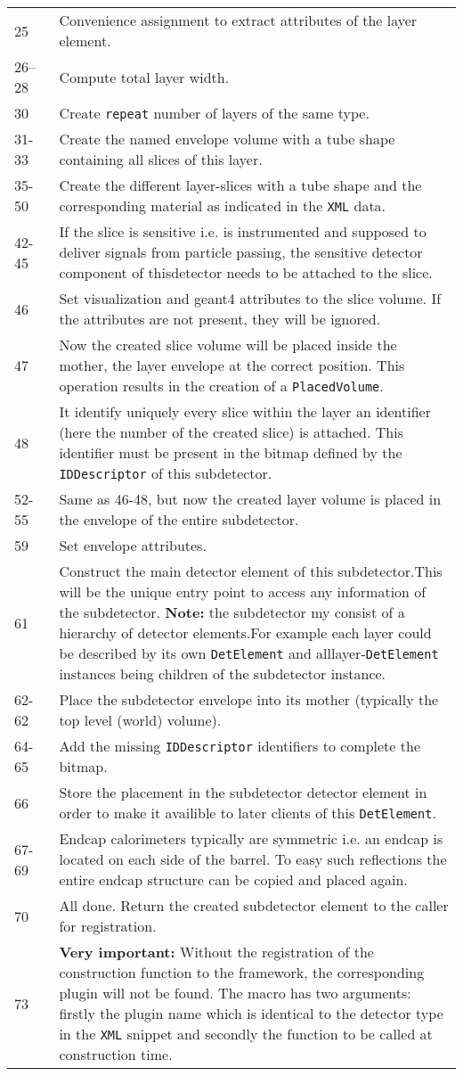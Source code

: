 {\begin{tabular} {p{0.1\linewidth}|p{0.9\linewidth}}
25 & Convenience assignment to extract attributes of the layer element.\\
26--28 & Compute total layer width.\\
30 & Create \texttt{repeat} number of layers of the same type.\\
31-33 & Create the named envelope volume with a tube shape containing all slices of this layer.\\
35-50 & Create the different layer-slices with a tube shape and the corresponding material as indicated in the \texttt{XML} data.\\
42-45 & If the slice is sensitive i.e. is instrumented and supposed to deliver signals from particle passing, the sensitive detector component of thisdetector needs to be attached to the slice.\\
46 & Set visualization and geant4 attributes to the slice volume. If the attributes are not present, they will be ignored.\\
47 & Now the created slice volume will be placed inside the mother, the layer envelope at the correct position. This operation results in the creation of a \texttt{PlacedVolume}.\\
48 & It identify uniquely every slice within the layer an identifier (here the number of the created slice) is attached. This identifier must be present in the bitmap defined by the \texttt{IDDescriptor} of this subdetector.\\
52-55 & Same as 46-48, but now the created layer volume is placed in the envelope of the entire subdetector.\\
59 & Set envelope attributes.\\
61 & Construct the main detector element of this subdetector.This will be the unique entry point to access any information of the subdetector. {\textbf{Note:}} the subdetector my consist of a hierarchy of detector elements.For example each layer could be described by its own \texttt{DetElement} and alllayer-\texttt{DetElement} instances being children of the subdetector instance.\\
62-62 & Place the subdetector envelope into its mother (typically the top level (world) volume).\\
64-65 & Add the missing \texttt{IDDescriptor} identifiers to complete the bitmap.\\
66 & Store the placement in the subdetector detector element in order to make it availible to later clients of this \texttt{DetElement}. \\
67-69 & Endcap calorimeters typically are symmetric i.e. an endcap is located on each side of the barrel. To easy such reflections the entire endcap structure can be copied and placed again. \\
70 & All done. Return the created subdetector element to the caller for registration. \\ 
73 & \textbf{Very important:} Without the registration of the construction function to the framework, the corresponding plugin will not be found. The macro has two arguments: firstly the plugin name which is identical to the detector type in the \texttt{XML} snippet and secondly the function to be called at construction time.
\end{tabular}
}
